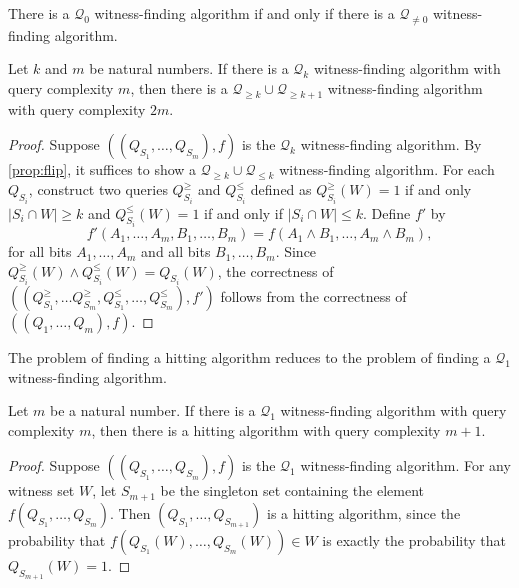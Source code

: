 \documentclass{article}
\newcommand{\mc}{\mathcal}
\begin{document}
\begin{corollary}\label{cor:flip}
  There is a $\mc{Q}_0$ witness-finding algorithm if and only if there is a $\mc{Q}_{\neq 0}$ witness-finding algorithm.
\end{corollary}

\begin{proposition}\label{prop:leqgeq}
  Let $k$ and $m$ be natural numbers.
  If there is a $\mc{Q}_k$ witness-finding algorithm with query complexity $m$, then there is a $\mc{Q}_{\geq k} \cup \mc{Q}_{\geq k + 1}$ witness-finding algorithm with query complexity $2 m$.
\end{proposition}
\begin{proof}
  Suppose $((Q_{S_1}, \dotsc, Q_{S_m}), f)$ is the $\mc{Q}_k$ witness-finding algorithm.
  By \autoref{prop:flip}, it suffices to show a $\mc{Q}_{\geq k} \cup \mc{Q}_{\leq k}$ witness-finding algorithm.
  For each $Q_{S_i}$, construct two queries $Q^\geq_{S_i}$ and $Q^\leq_{S_i}$ defined as $Q^\geq_{S_i}(W) = 1$ if and only $|S_i \cap W| \geq k$ and $Q^\leq_{S_i}(W) = 1$ if and only if $|S_i \cap W| \leq k$.
  Define $f'$ by
  \begin{equation*}
    f'(A_1, \dotsc, A_m, B_1, \dotsc, B_m) = f(A_1 \land B_1, \dotsc, A_m \land B_m),
  \end{equation*}
  for all bits $A_1, \dotsc, A_m$ and all bits $B_1, \dotsc, B_m$.
  Since $Q^\geq_{S_i}(W) \land Q^\leq_{S_i}(W) = Q_{S_i}(W)$, the correctness of $((Q^\geq_{S_1}, \dotsc Q^\geq_{S_m}, Q^\leq_{S_1}, \dotsc, Q^\leq_{S_m}), f')$ follows from the correctness of $((Q_1, \dotsc, Q_m), f)$.
\end{proof}

The problem of finding a hitting algorithm reduces to the problem of finding a $\mc{Q}_1$ witness-finding algorithm.

\begin{lemma}\label{lem:reduction}
  Let $m$ be a natural number.
  If there is a $\mc{Q}_1$ witness-finding algorithm with query complexity $m$, then there is a hitting algorithm with query complexity $m + 1$.
\end{lemma}
\begin{proof}
  Suppose $((Q_{S_1}, \dotsc, Q_{S_m}), f)$ is the $\mc{Q}_1$ witness-finding algorithm.
  For any witness set $W$, let $S_{m + 1}$ be the singleton set containing the element $f(Q_{S_1}, \dotsc, Q_{S_m})$.
  Then $(Q_{S_1}, \dotsc, Q_{S_{m + 1}})$ is a hitting algorithm, since the probability that $f(Q_{S_1}(W), \dotsc, Q_{S_m}(W)) \in W$ is exactly the probability that $Q_{S_{m + 1}}(W) = 1$.
\end{proof}
\end{document}
